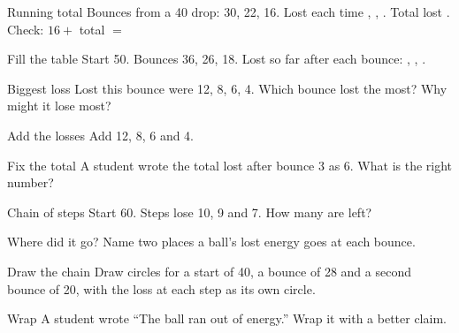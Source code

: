 \clearpage

\begin{puzzle}{Running total}
Bounces from a 40 drop: 30, 22, 16. Lost each time \wline[1.2cm], \wline[1.2cm], \wline[1.2cm]. Total lost \wline[1.2cm]. Check: $16+$ total $=$ \wline[1.2cm]
\end{puzzle}

\begin{puzzle}{Fill the table}
Start 50. Bounces 36, 26, 18. Lost so far after each bounce: \wline[1.2cm], \wline[1.2cm], \wline[1.2cm].
\end{puzzle}

\begin{puzzle}{Biggest loss}
Lost this bounce were 12, 8, 6, 4. Which bounce lost the most? \wline[1.6cm] Why might it lose most? \wline[4cm]
\end{puzzle}

\begin{puzzle}{Add the losses}
Add 12, 8, 6 and 4. \wline[1.6cm]
\end{puzzle}

\begin{puzzle}{Fix the total}
A student wrote the total lost after bounce 3 as 6. What is the right number? \wline[1.6cm]
\end{puzzle}

\clearpage

\begin{puzzle}{Chain of steps}
Start 60. Steps lose 10, 9 and 7. How many are left? \wline[1.6cm]
\end{puzzle}

\begin{puzzle}{Where did it go?}
Name two places a ball's lost energy goes at each bounce. \wline[5cm]
\end{puzzle}

\begin{puzzle}{Draw the chain}
Draw circles for a start of 40, a bounce of 28 and a second bounce of 20, with the loss at each step as its own circle.
\begin{center}\end{center}
\end{puzzle}

\begin{puzzle}{Wrap}
A student wrote ``The ball ran out of energy.'' Wrap it with a better claim. \wline[6cm]
\end{puzzle}

